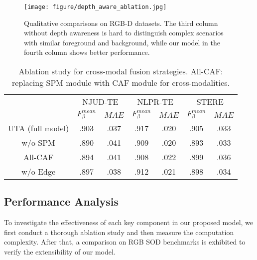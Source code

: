 \documentclass[journal]{IEEEtran}
\begin{document}
\begin{figure}[t]
	\begin{center}
\texttt{[image: figure/depth\_aware\_ablation.jpg]}
		\caption{Qualitative comparisons on RGB-D datasets. The third column without depth awareness is hard to distinguish complex scenarios with similar foreground and background, while our model in the fourth column shows better performance.
		}\label{fig:analysis}
	\end{center}
\end{figure}






\linespread{1.3}
\begin{table}[t]
    \caption{Ablation study for cross-modal fusion strategies. All-CAF: replacing SPM module with CAF module for cross-modalities. }
\label{table: SPM ablation}
\begin{center}
\renewcommand\tabcolsep{3.0pt}
\begin{tabular}{c|cc|cc|cc}
\hline
\multirow{2}{*}{} & \multicolumn{2}{c|}{NJUD-TE} & \multicolumn{2}{c|}{NLPR-TE} & \multicolumn{2}{c}{STERE}  \\
         & $F^{mean}_\beta$ & $MAE$ & $F^{mean}_\beta$ & $MAE$ & $F^{mean}_\beta$ & $MAE$ \\ \hline
UTA (full model)     & .903 & .037 & .917 & .020 & .905 & .033  \\
w/o SPM  & .890 & .041 & .909 & .020 & .893 & .033  \\
All-CAF     & .894 & .041 & .908 & .022 & .899 & .036  \\
w/o Edge & .897 & .038 & .912 & .021 & .898 & .034  \\\hline
\end{tabular}
\end{center}
\end{table}
\linespread{1}








\subsection{Performance Analysis}

To investigate the effectiveness of each key component in our proposed model, we first conduct a thorough ablation study and then measure the computation complexity. After that, a comparison on RGB SOD benchmarks is exhibited to verify the extensibility of our model.
\end{document}
